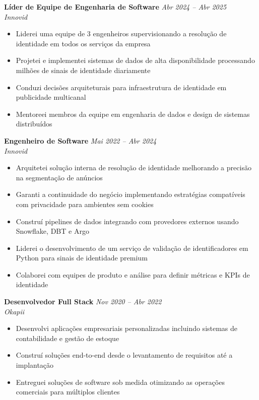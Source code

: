 \documentclass[10pt,a4paper]{article}
\newcommand{\cventry}[3]{%
  \textbf{#1} \hfill \textit{#3}\\[3pt]
  \textit{#2}%
}
\begin{document}
\vspace{0.25cm}

\cventry{Líder de Equipe de Engenharia de Software}{Innovid}{Abr 2024 -- Abr 2025}
\begin{itemize}[leftmargin=*, noitemsep, topsep=3pt, itemsep=2pt]
  \item Liderei uma equipe de 3 engenheiros supervisionando a resolução de
        identidade em todos os serviços da empresa
  \item Projetei e implementei sistemas de dados de alta disponibilidade
        processando milhões de sinais de identidade diariamente
  \item Conduzi decisões arquiteturais para infraestrutura de identidade em
        publicidade multicanal
  \item Mentoreei membros da equipe em engenharia de dados e design de
        sistemas distribuídos
\end{itemize}

\vspace{0.25cm}

\cventry{Engenheiro de Software}{Innovid}{Mai 2022 -- Abr 2024}
\begin{itemize}[leftmargin=*, noitemsep, topsep=3pt, itemsep=2pt]
  \item Arquitetei solução interna de resolução de identidade melhorando a
        precisão na segmentação de anúncios
  \item Garanti a continuidade do negócio implementando estratégias compatíveis
        com privacidade para ambientes sem cookies
  \item Construí pipelines de dados integrando com provedores externos usando
        Snowflake, DBT e Argo
  \item Liderei o desenvolvimento de um serviço de validação de identificadores
        em Python para sinais de identidade premium
  \item Colaborei com equipes de produto e análise para definir métricas e
        KPIs de identidade
\end{itemize}

\vspace{0.25cm}

\cventry{Desenvolvedor Full Stack}{Okapii}{Nov 2020 -- Abr 2022}
\begin{itemize}[leftmargin=*, noitemsep, topsep=3pt, itemsep=2pt]
  \item Desenvolvi aplicações empresariais personalizadas incluindo sistemas de
        contabilidade e gestão de estoque
  \item Construí soluções end-to-end desde o levantamento de requisitos até a
        implantação
  \item Entreguei soluções de software sob medida otimizando as operações
        comerciais para múltiplos clientes
\end{itemize}
\end{document}
